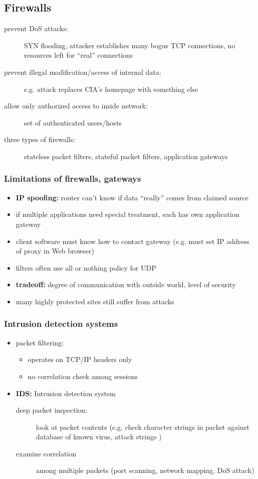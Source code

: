 \subsection{Firewalls}
\begin{description}
	\item[prevent DoS attacks:] SYN flooding, attacker establishes many bogus TCP connections, no resources left for ``real'' connections
	\item[prevent illegal modification/access of internal data:] e.g. attack replaces CIA's homepage with something else
	\item[allow only authorized access to inside network:] set of authenticated users/hosts
	\item[three types of firewalls:] stateless packet filters, stateful packet filters, application gateways
\end{description}
\subsubsection{Limitations of firewalls, gateways}
\begin{itemize}
	\item \textbf{IP spoofing:} router can't know if data ``really'' comes from claimed source
	\item if multiple applications need special treatment, each has own application gateway
	\item client software must know how to contact gateway (e.g. must set IP address of proxy in Web browser)
	\item filters often use all or nothing policy for UDP
	\item \textbf{tradeoff:} degree of communication with outside world, level of security
	\item many highly protected sites still suffer from attacks
\end{itemize}
\subsubsection{Intrusion detection systems}
\begin{itemize}
	\item packet filtering:
	\begin{itemize}
		\item operates on TCP/IP headers only
		\item no correlation check among sessions
	\end{itemize}
	\item \textbf{IDS:} Intrusion detection system
	\begin{description}
		\item[deep packet inspection:] look at packet contents (e.g. check character strings in packet against database of known virus, attack strings
		)
		\item[examine correlation] among multiple packets (port scanning, network mapping, DoS attack)
	\end{description}
\end{itemize}